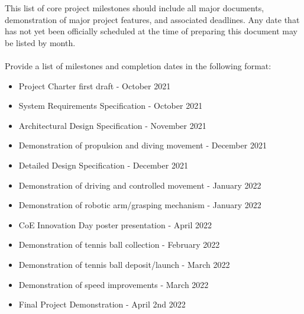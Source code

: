 This list of core project milestones should include all major documents, demonstration of major project features, and associated deadlines. Any date that has not yet been officially scheduled at the time of preparing this document may be listed by month.
\\
\\
Provide a list of milestones and completion dates in the following format:
\begin{itemize}
  \item Project Charter first draft - October 2021
  \item System Requirements Specification - October 2021
  \item Architectural Design Specification - November 2021
  \item Demonstration of propulsion and diving movement - December 2021
  \item Detailed Design Specification - December 2021
  \item Demonstration of driving and controlled movement - January 2022
  \item Demonstration of robotic arm/grasping mechanism - January 2022
  \item CoE Innovation Day poster presentation - April 2022
  \item Demonstration of tennis ball collection - February 2022
  \item Demonstration of tennis ball deposit/launch - March 2022
  \item Demonstration of speed improvements - March 2022
  \item Final Project Demonstration - April 2nd 2022
\end{itemize}